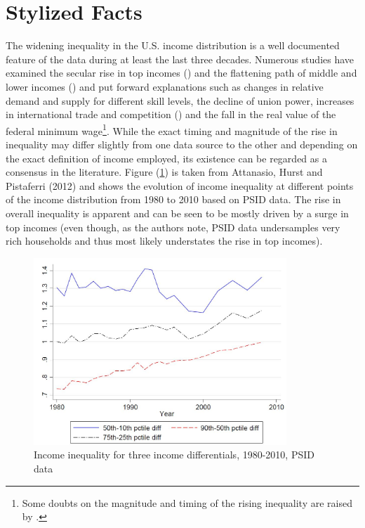 \section{Stylized Facts}\label{sec:sf}
The widening inequality in the U.S. income distribution is a well documented feature of the data during at least the last three decades. Numerous studies have examined the secular rise in top incomes (\citealp{PikettySaez2003}) and the flattening path of middle and lower incomes (\citealp{AutorKatzKearney2005}) and put forward explanations such as changes in relative demand and supply for different skill levels, the decline of union power, increases in international trade and competition (\citealp{Ma2013}) and the fall in the real value of the federal minimum wage\footnote{Some doubts on the magnitude and timing of the rising inequality are raised by \citet{Gordon2009}.}. While the exact timing and magnitude of the rise in inequality may differ slightly from one data source to the other and depending on the exact definition of income employed, its existence can be regarded as a consensus in the literature. Figure (\ref{fig:inc_ineq}) is taken from Attanasio, Hurst and Pistaferri (2012) and shows the evolution of income inequality at different points of the income distribution from 1980 to 2010 based on PSID data. The rise in overall inequality is apparent and can be seen to be mostly driven by a surge in top incomes (even though, as the authors note, PSID data undersamples very rich households and thus most likely understates the rise in top incomes). 
\begin{figure}[ht]
	\centering
		\includegraphics[width=0.85\textwidth]{inc_ineq_attanasio2012.JPG}
		\caption{Income inequality for three income differentials, 1980-2010, PSID data}
	\label{fig:inc_ineq}
\end{figure}
